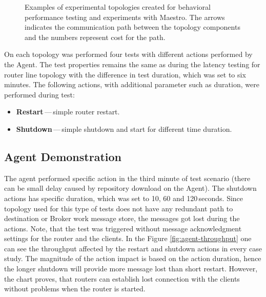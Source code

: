 \begin{figure}[h]
\begin{minipage}{0.45\linewidth}
	\end{minipage}
	\caption[Examples of experimental topologies created for behavioral performance testing and experiments with Maestro.]{Examples of experimental topologies created for behavioral performance testing and experiments with Maestro. The arrows indicates the communication path between the topology components and the numbers represent cost for the path.}\label{fig:agent_topologies}
\end{figure}

On each topology was performed four tests with different actions performed by the Agent. The test properties remains the same as during the latency testing for router line topology with the difference in test duration, which was set to six minutes. The following actions, with additional parameter such as duration, were performed during test:

\begin{itemize}
	\setlength\itemsep{0em}
	\item \textbf{Restart}\,---\,simple router restart.
	\item \textbf{Shutdown}\,---\,simple shutdown and start for different time duration.
\end{itemize}

\subsection{Agent Demonstration}
The agent performed specific action in the third minute of test scenario (there can be small delay caused by repository download on the Agent). The shutdown actions has specific duration, which was set to 10, 60 and 120\,seconds. Since topology used for this type of tests does not have any redundant path to destination or Broker work message store, the messages got lost during the actions. Note, that the test was triggered without message acknowledgment settings for the router and the clients. In the Figure \ref{fig:agent-throughput} one can see the throughput affected by the restart and shutdown actions in every case study. The magnitude of the action impact is based on the action duration, hence the longer shutdown will provide more message lost than short restart. However, the chart proves, that routers can establish lost connection with the clients without problems when the router is started.

